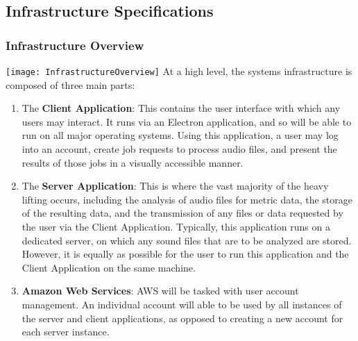 \subsection{Infrastructure Specifications}

\subsubsection{Infrastructure Overview}
\texttt{[image: InfrastructureOverview]}
\newpage
At a high level, the system\textquotesingle s infrastructure is composed of three main parts:
\begin{enumerate}
    \item The \textbf{Client Application}: This contains the user interface with which any users may interact. It runs via an Electron application, and so will be able to run on all major operating systems. Using this application, a user may log into an account, create job requests to process audio files, and present the results of those jobs in a visually accessible manner.
    \item The \textbf{Server Application}: This is where the vast majority of the heavy lifting occurs, including the analysis of audio files for metric data, the storage of the resulting data, and the transmission of any files or data requested by the user via the Client Application. Typically, this application runs on a dedicated server, on which any sound files that are to be analyzed are stored. However, it is equally as possible for the user to run this application and the Client Application on the same machine.
    \item \textbf{Amazon Web Services}: AWS will be tasked with user account management. An individual account will able to be used by all instances of the server and client applications, as opposed to creating a new account for each server instance.
\end{enumerate}

